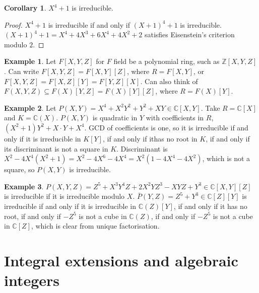 \documentclass{article}
\newcommand{\Z}{\mathbb{Z}}
\newcommand{\C}{\mathbb{C}}
\newcommand{\rb}[1]{\left( #1 \right)}
\renewcommand{\sb}[1]{\left[ #1 \right]}
\theoremstyle{definition}\newtheorem{definition}{Definition}[subsection]
\theoremstyle{definition}\newtheorem{remark}[definition]{Remark}
\theoremstyle{definition}\newtheorem*{example}{Example}
\theoremstyle{definition}\newtheorem*{note}{Note}
\newtheorem{corollary}[definition]{Corollary}
\begin{document}
\begin{corollary}
$ X^4 + 1 $ is irreducible.
\end{corollary}

\begin{proof}
$ X^4 + 1 $ is irreducible if and only if $ \rb{X + 1}^4 + 1 $ is irreducible. $ \rb{X + 1}^4 + 1 = X^4 + 4X^3 + 6X^4 + 4X^2 + 2 $ satisfies Eisenstein's criterion modulo $ 2 $.
\end{proof}


\begin{example}
Let $ F\sb{X, Y, Z} $ for $ F $ field be a polynomial ring, such as $ \Z\sb{X, Y, Z} $. Can write $ F\sb{X, Y, Z} = F\sb{X, Y}\sb{Z} $, where $ R = F\sb{X, Y} $, or $ F\sb{X, Y, Z} = F\sb{X, Z}\sb{Y} = F\sb{Y, Z}\sb{X} $. Can also think of $ F\rb{X, Y, Z} \subseteq F\rb{X}\sb{Y, Z} = F\rb{X}\sb{Y}\sb{Z} $, where $ R = F\rb{X}\sb{Y} $.
\end{example}

\begin{example}
Let $ P\rb{X, Y} = X^4 + X^2Y^2 + Y^2 + XY \in \C\sb{X, Y} $. Take $ R = \C\sb{X} $ and $ K = \C\rb{X} $. $ P\rb{X, Y} $ is quadratic in $ Y $ with coefficients in $ R $, $ \rb{X^2 + 1}Y^2 + X \cdot Y + X^4 $. GCD of coefficients is one, so it is irreducible if and only if it is irreducible in $ K\sb{Y} $, if and only if ithas no root in $ K $, if and only if its discriminant is not a square in $ K $. Discriminant is $ X^2 - 4X^4\rb{X^2 + 1} = X^2 - 4X^6 - 4X^4 = X^2\rb{1 - 4X^4 - 4X^2} $, which is not a square, so $ P\rb{X, Y} $ is irreducible.
\end{example}

\begin{example}
$ P\rb{X, Y, Z} = Z^5 + X^3Y^4Z + 2X^2YZ^3 - XYZ + Y^3 \in \C\sb{X, Y}\sb{Z} $ is irreducible if it is irreducible modulo $ X $. $ \bar{P}\rb{Y, Z} = Z^5 + Y^3 \in \C\sb{Z}\sb{Y} $ is irreducible if and only if it is irreducible in $ \C\rb{Z}\sb{Y} $, if and only if it has no root, if and only if $ -Z^5 $ is not a cube in $ \C\rb{Z} $, if and only if $ -Z^5 $ is not a cube in $ \C\sb{Z} $, which is clear from unique factorisation.
\end{example}

\section{Integral extensions and algebraic integers}
\end{document}
